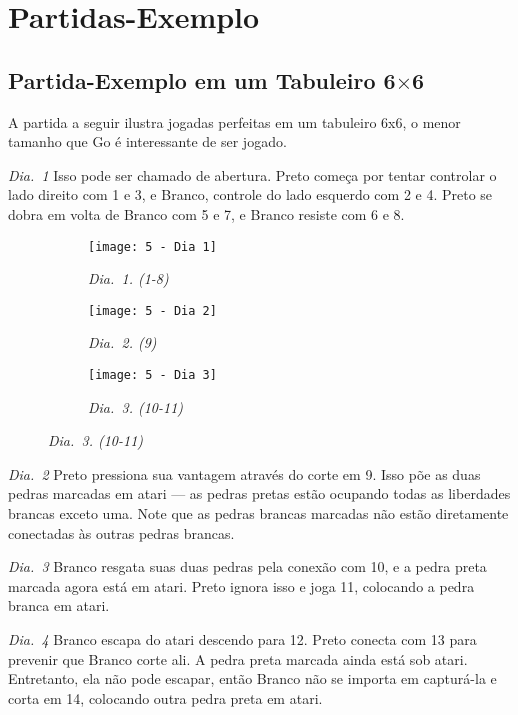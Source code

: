 \chapter{Partidas-Exemplo}\label{chap:cinco}

\section{Partida-Exemplo em um Tabuleiro \texorpdfstring{6$\times$6}{6x6}}

A partida a seguir ilustra jogadas perfeitas em um tabuleiro 6x6, o menor tamanho que Go é interessante de ser jogado.

\emph{Dia.\@~1} Isso pode ser chamado de abertura. Preto começa por tentar controlar o lado direito com 1 e 3, e Branco, controle do lado esquerdo com 2 e 4. Preto se dobra em volta de Branco com 5 e 7, e Branco resiste com 6 e 8.

\begin{figure}[h!]
  \centering
  \begin{subfigure}[t]{.3\textwidth}
      \centering
      \texttt{[image: 5 - Dia 1]}
      \caption*{\emph{Dia.\@~1. (1-8)}}
  \end{subfigure}
  \hfill
  \begin{subfigure}[t]{.3\textwidth}
      \centering
      \texttt{[image: 5 - Dia 2]}
      \caption*{\emph{Dia.\@~2. (9)}}
  \end{subfigure}
  \hfill
  \begin{subfigure}[t]{.3\textwidth}
      \centering
      \texttt{[image: 5 - Dia 3]}
      \caption*{\emph{Dia.\@~3. (10-11)}}
  \end{subfigure}
\end{figure}

\emph{Dia.\@~2} Preto pressiona sua vantagem através do corte em 9. Isso põe as duas pedras marcadas em atari --- as pedras pretas estão ocupando todas as liberdades brancas exceto uma. Note que as pedras brancas marcadas não estão diretamente conectadas às outras pedras brancas.

\emph{Dia.\@~3} Branco resgata suas duas pedras pela conexão com 10, e a pedra preta marcada agora está em atari. Preto ignora isso e joga 11, colocando a pedra branca em atari.

\pagebreak

\emph{Dia.\@~4} Branco escapa do atari descendo para 12. Preto conecta com 13 para prevenir que Branco corte ali. A pedra preta marcada ainda está sob atari. Entretanto, ela não pode escapar, então Branco não se importa em capturá-la e corta em 14, colocando outra pedra preta em atari.

